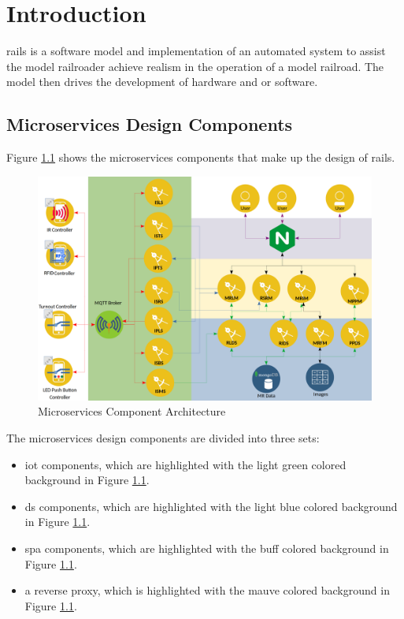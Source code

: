 \chapter{Introduction}
\gls{rails} is a software model and implementation of an automated system to assist the model railroader achieve realism in the operation of a model railroad. The model then drives the development of hardware and or software.
\section{Microservices Design Components}
Figure \ref{fig:microarchitecture} shows the microservices components that make up the design of \gls{rails}.

\begin{figure}[H]
	\centering
		\includegraphics[scale=0.15]{../Images/micro-services-arch.png}
	\caption{Microservices Component Architecture}
	\label{fig:microarchitecture}
\end{figure}

The microservices design components are divided into three sets:
\begin{itemize}
  \item \gls{iot} components, which are highlighted with the light green colored background in Figure \ref{fig:microarchitecture}.
  \item \gls{ds} components, which are highlighted with the light blue colored background in Figure \ref{fig:microarchitecture}.
  \item \gls{spa} components, which are highlighted with the buff colored background in Figure \ref{fig:microarchitecture}.
  \item a reverse proxy, which is highlighted with the mauve colored background in Figure \ref{fig:microarchitecture}.
\end{itemize}

